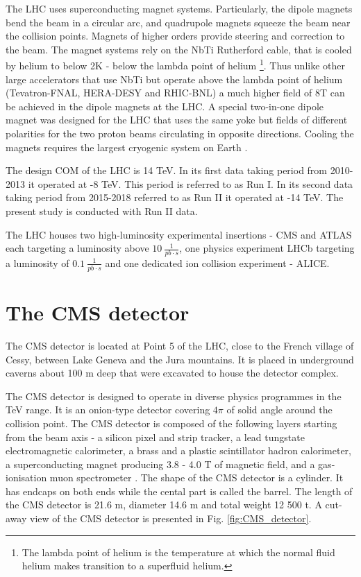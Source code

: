 The LHC uses superconducting magnet systems. Particularly, the dipole magnets bend the beam in a circular arc, and quadrupole magnets squeeze the beam near the collision points. Magnets of higher orders provide steering and correction to the beam. The magnet systems rely on the NbTi Rutherford cable, that is cooled by helium to below 2K - below the lambda point of helium \footnote{The lambda point of helium is the temperature at which the normal fluid helium makes transition to a superfluid helium.}. Thus unlike other large accelerators that use NbTi but operate above the lambda point of helium (Tevatron-FNAL, HERA-DESY and RHIC-BNL) a much higher field of 8T can be achieved in the dipole magnets at the LHC. A special two-in-one dipole magnet was designed for the LHC that uses the same yoke but fields of different polarities for the two proton beams circulating in opposite directions. Cooling the magnets requires the largest cryogenic system on Earth \cite{MYERS:2013hra} \cite{Evans:2008zzb}.

The design COM of the LHC is 14 TeV. In its first data taking period from 2010-2013 it operated at -8 TeV. This period is referred to as Run I. In its second data taking period from 2015-2018 referred to as Run II it operated at -14 TeV. The present study is conducted with Run II data.

The LHC houses two high-luminosity experimental insertions - CMS and ATLAS each targeting a luminosity above $10\ {\frac{1}{pb\cdot s}}$, one \cPqb physics experiment LHCb targeting a luminosity of $0.1\ \frac{1}{pb\cdot s}$ and one dedicated ion collision experiment - ALICE. 

\section{The CMS detector}

The CMS detector is located at Point 5 of the LHC, close to the French village of Cessy, between Lake Geneva and the Jura mountains. It is placed in underground caverns about 100 m deep that were excavated to house the detector complex.

The CMS detector is designed to operate in diverse physics programmes in the TeV range. It is an onion-type detector covering $4\pi$ of solid angle around the collision point. The CMS detector is composed of the following layers starting from the beam axis - a silicon pixel and strip tracker, a lead tungstate electromagnetic calorimeter, a brass and a plastic scintillator hadron calorimeter, a superconducting magnet producing 3.8 - 4.0 T of magnetic field, and a gas-ionisation muon spectrometer \cite{Chatrchyan:2008aa}. The shape of the CMS detector is a cylinder. It has endcaps on both ends while the cental part is called the barrel. The length of the CMS detector is 21.6 m, diameter 14.6 m and total weight 12 500 t. A cut-away view of the CMS detector is presented in Fig. \ref{fig:CMS_detector}.

